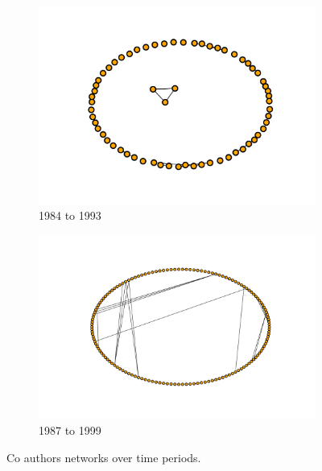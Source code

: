 \documentclass{article}
\begin{document}
\begin{center}
\begin{figure}[!hbtp]
\begin{subfigure}{.22\textwidth}
            \includegraphics[width=\textwidth]{./assets/images/network_over_period_2.pdf}
            \caption{1984 to 1993}
        \end{subfigure}
        \begin{subfigure}{.22\textwidth}
            \includegraphics[width=\textwidth]{./assets/images/network_over_period_3.pdf}
            \caption{1987 to 1999}
        \end{subfigure}
        \caption{Co authors networks over time periods.}\label{fig:co_authors_over_time_periods}
    \end{figure} %
    \end{center}
\end{document}
